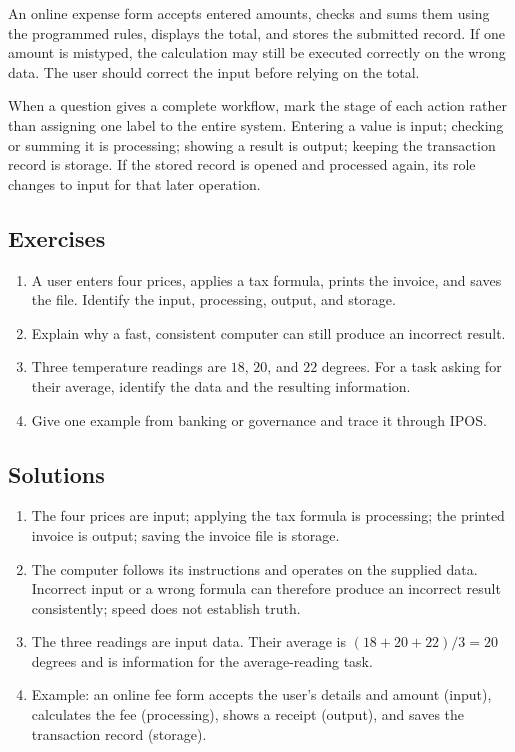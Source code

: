 \begin{example}
An online expense form accepts entered amounts, checks and sums them using
the programmed rules, displays the total, and stores the submitted record.
If one amount is mistyped, the calculation may still be executed correctly
on the wrong data. The user should correct the input before relying on the
total.
\end{example}

When a question gives a complete workflow, mark the stage of each action
rather than assigning one label to the entire system. Entering a value is
input; checking or summing it is processing; showing a result is output;
keeping the transaction record is storage. If the stored record is opened
and processed again, its role changes to input for that later operation.

\subsection*{Exercises}
\begin{enumerate}[label=\arabic*.]
  \item A user enters four prices, applies a tax formula, prints the invoice,
    and saves the file. Identify the input, processing, output, and storage.
  \item Explain why a fast, consistent computer can still produce an
    incorrect result.
  \item Three temperature readings are $18$, $20$, and $22$ degrees. For a
    task asking for their average, identify the data and the resulting
    information.
  \item Give one example from banking or governance and trace it through
    IPOS.
\end{enumerate}

\subsection*{Solutions}
\begingroup\small
\begin{enumerate}[label=\arabic*.]
  \item The four prices are input; applying the tax formula is processing;
    the printed invoice is output; saving the invoice file is storage.
  \item The computer follows its instructions and operates on the supplied
    data. Incorrect input or a wrong formula can therefore produce an
    incorrect result consistently; speed does not establish truth.
  \item The three readings are input data. Their average is
    $(18+20+22)/3=20$ degrees and is information for the average-reading
    task.
  \item Example: an online fee form accepts the user's details and amount
    (input), calculates the fee (processing), shows a receipt (output), and
    saves the transaction record (storage).
\end{enumerate}
\endgroup

